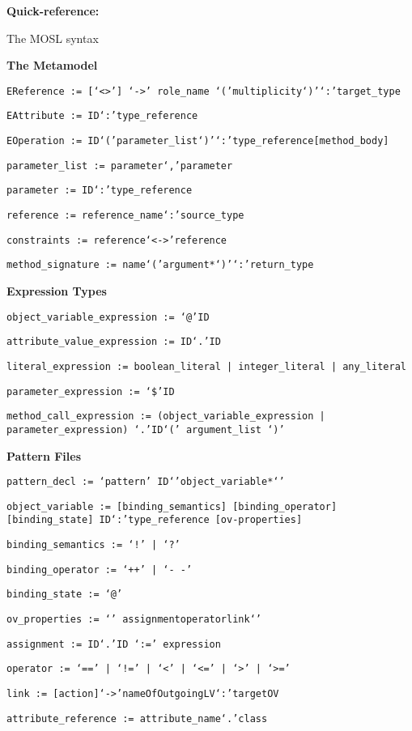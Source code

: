 \newpage
{}
{}
\hypertarget{quickRef}{}

\vspace{1cm}
{\Huge \bf Quick-reference:}

{\huge \hspace{3cm} The MOSL syntax}
\vspace{1cm}


{\bf The Metamodel}

\texttt{EReference := [`<>'] `->' role\_name `('multiplicity`)'`:'target\_type}

\texttt{EAttribute := ID`:'type\_reference}

\texttt{EOperation := ID`('parameter\_list`)'`:'type\_reference[method\_body]}

\texttt{parameter\_list := parameter`,'parameter}

\texttt{parameter := ID`:'type\_reference}

\texttt{reference := reference\_name`:'source\_type}

\texttt{constraints := reference`<->'reference}

\texttt{method\_signature := name`('argument*`)'`:'return\_type}

\vspace{1cm}



{\bf Expression Types}

\texttt{object\_variable\_expression := `@'ID}

\texttt{attribute\_value\_expression := ID`.'ID}

\texttt{literal\_expression := boolean\_literal | integer\_literal | any\_literal}

\texttt{parameter\_expression := `\$'ID}

\texttt{method\_call\_expression := (object\_variable\_expression | parameter\_expression) `.'ID`(' argument\_list `)'}

\vspace{1cm}

{\bf Pattern Files}

\texttt{pattern\_decl := `pattern' ID`{'object\_variable*`}' }

\texttt{object\_variable := [binding\_semantics] [binding\_operator] [binding\_state] ID`:'type\_reference [ov-properties]}

\texttt{binding\_semantics := `!' | `?'}

\texttt{binding\_operator := `++' | `-~-'}

\texttt{binding\_state := `@'}

\texttt{ov\_properties := `{' {assignment}{operator}{link}`}' }

\texttt{assignment := ID`.'ID `:=' expression}

\texttt{operator := `==' | `!=' | `<' | `<=' | `>' | `>='}

\texttt{link := [action]`->'nameOfOutgoingLV`:'targetOV}

\texttt{attribute\_reference := attribute\_name`.'class}
